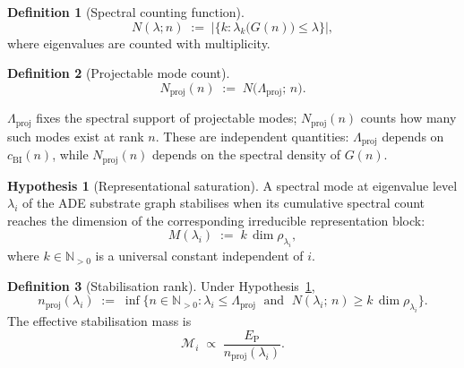 \documentclass[12pt, a4paper]{article}
\theoremstyle{plain}
\theoremstyle{definition}
\newtheorem{definition}{Definition}[section]
\newtheorem{hypothesis}{Hypothesis}[section]
\theoremstyle{remark}
\begin{document}
      \begin{definition}[Spectral counting function]
        \label{def:counting}
        \begin{equation}
          \label{eq:counting-def}
          N(\lambda; n)
          \;:=\; \bigl|\bigl\{k : \lambda_k\bigl(G(n)\bigr) \leq \lambda\bigr\}\bigr|,
        \end{equation}
        where eigenvalues are counted with multiplicity.
      \end{definition}

      \begin{definition}[Projectable mode count]
        \label{def:Nproj}
        \begin{equation}
          \label{eq:Nproj-def}
          N_{\mathrm{proj}}(n)
          \;:=\; N\bigl(\Lambda_{\mathrm{proj}};\, n\bigr).
        \end{equation}
      \end{definition}

      \noindent
      $\Lambda_{\mathrm{proj}}$ fixes the spectral support of projectable modes;
      $N_{\mathrm{proj}}(n)$ counts how many such modes exist at rank $n$.
      These are independent quantities: $\Lambda_{\mathrm{proj}}$ depends on
      $c_{\mathrm{BI}}(n)$, while $N_{\mathrm{proj}}(n)$ depends on the spectral density of
      $G(n)$.

      \begin{hypothesis}[Representational saturation]
        \label{hyp:saturation-rep}
        A spectral mode at eigenvalue level $\lambda_i$ of the ADE substrate graph
        stabilises when its cumulative spectral count reaches the dimension of the
        corresponding irreducible representation block:
        \begin{equation}
          \label{eq:saturation-condition}
          M(\lambda_i) \;:=\; k\,\dim \rho_{\lambda_i},
        \end{equation}
        where $k \in \mathbb{N}_{>0}$ is a universal constant independent of $i$.
      \end{hypothesis}

      \begin{definition}[Stabilisation rank]
        \label{def:nproj}
        Under Hypothesis~\ref{hyp:saturation-rep},
        \begin{equation}
          \label{eq:nproj-def}
          n_{\mathrm{proj}}(\lambda_i)
          \;:=\; \inf\bigl\{n \in \mathbb{N}_{>0} :
          \lambda_i \leq \Lambda_{\mathrm{proj}}
          \;\text{ and }\;
          N(\lambda_i;\, n) \geq k\,\dim\rho_{\lambda_i}
          \bigr\}.
        \end{equation}
        The effective stabilisation mass is
        \begin{equation}
          \label{eq:mass-def}
          \mathcal{M}_i \;\propto\; \frac{E_{\mathrm{P}}}{n_{\mathrm{proj}}(\lambda_i)}.
        \end{equation}
      \end{definition}
\end{document}
